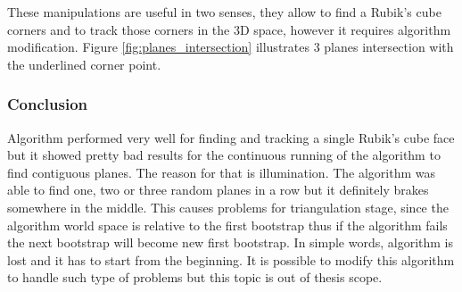 \documentclass[../../main]{subfiles}
\begin{document}
\newpage

These manipulations are useful in two senses, they allow to find a Rubik's cube corners and to track those corners in the 3D space, however it requires algorithm modification. Figure \ref{fig:planes_intersection} illustrates 3 planes intersection with the underlined corner point.

\subsubsection{Conclusion}

Algorithm performed very well for finding and tracking a single Rubik's cube face but it showed pretty bad results for the continuous running of the algorithm to find contiguous planes. The reason for that is illumination. The algorithm was able to find one, two or three random planes in a row but it definitely brakes somewhere in the middle. This causes problems for triangulation stage, since the algorithm world space is relative to the first bootstrap thus if the algorithm fails the next bootstrap will become new first bootstrap. In simple words, algorithm is lost and it has to start from the beginning. It is possible to modify this algorithm to handle such type of problems but this topic is out of thesis scope.
\end{document}
